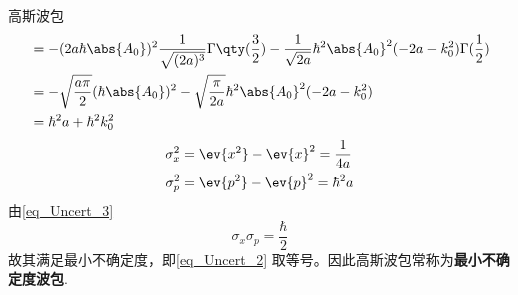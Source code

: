 \begin{example}{高斯波包}
\begin{equation}
\begin{aligned}
&=-(2a\hbar\abs{A_0})^2\frac{1}{\sqrt{(2a)^3}}\Gamma\qty(\frac{3}{2})-\frac{1}{\sqrt{2a}}\hbar^2 \abs{A_0}^2(-2a-k_0^2)\Gamma(\frac{1}{2})\\
&=-\sqrt{\frac{a\pi}{2}}(\hbar\abs{A_0})^2-\sqrt{\frac{\pi}{2a}}\hbar^2 \abs{A_0}^2(-2a-k_0^2)\\
&=\hbar^2a+\hbar^2k_0^2
\end{aligned}
\end{equation}
\begin{equation}\label{eq_Uncert_3}
\begin{aligned}
\sigma_x^2&=\ev{x^2}-\ev{x}^2=\frac{1}{4a} \\
\sigma_p^2&=\ev{p^2}-\ev{p}^2=\hbar^2a
\end{aligned}
\end{equation}
由\autoref{eq_Uncert_3} 
\begin{equation}
\sigma_x\sigma_p=\frac{\hbar}{2}
\end{equation}
故其满足最小不确定度，即\autoref{eq_Uncert_2} 取等号。因此高斯波包常称为\textbf{最小不确定度波包}.
\end{example}














